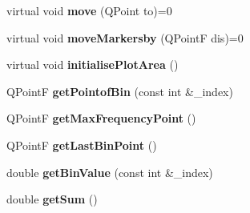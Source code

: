 \begin{DoxyCompactItemize}
\item 
\mbox{\label{classBarScreen_abbb759e28aa304adc0734830fb5d859e}} 
virtual void {\bfseries move} (Q\+Point to)=0
\item 
\mbox{\label{classBarScreen_ab09a99155d2aa5b19baf093129cdf685}} 
virtual void {\bfseries move\+Markersby} (Q\+PointF dis)=0
\item 
\mbox{\label{classBarScreen_a84c57e7a3258ab5b3f71248d834d1187}} 
virtual void {\bfseries initialise\+Plot\+Area} ()
\item 
\mbox{\label{classBarScreen_a3c553483ebb07bd496004d8300eb804f}} 
Q\+PointF {\bfseries get\+Pointof\+Bin} (const int \&\+\_\+index)
\item 
\mbox{\label{classBarScreen_acba5c2bfeac649e5ffdea5255a4537d8}} 
Q\+PointF {\bfseries get\+Max\+Frequency\+Point} ()
\item 
\mbox{\label{classBarScreen_a2a02e1300c43cebc6b61140e7aebc82c}} 
Q\+PointF {\bfseries get\+Last\+Bin\+Point} ()
\item 
\mbox{\label{classBarScreen_aad073d21512c112ca8892e1d7be7b21c}} 
double {\bfseries get\+Bin\+Value} (const int \&\+\_\+index)
\item 
\mbox{\label{classBarScreen_ab6abcfa2f17cd1abe87f33cd2de73683}} 
double {\bfseries get\+Sum} ()
\end{DoxyCompactItemize}

